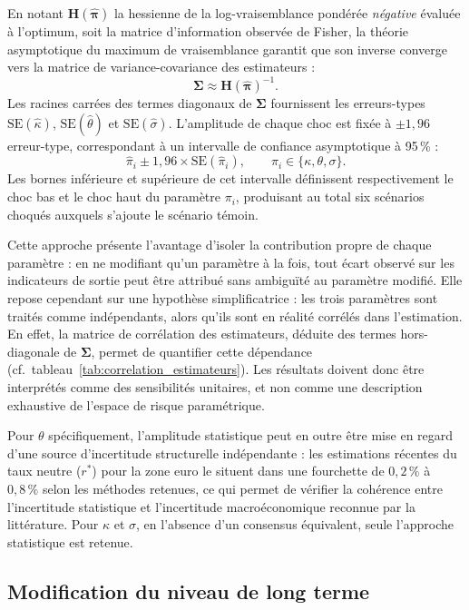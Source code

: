 En notant $\mathbf{H}(\hat{\boldsymbol{\pi}})$ la hessienne de la log-vraisemblance pondérée \textit{négative} évaluée à l'optimum, soit la matrice d'information observée de Fisher, la théorie asymptotique du maximum de vraisemblance garantit que son inverse converge vers la matrice de variance-covariance des estimateurs :
\[
    \boldsymbol{\Sigma} \approx \mathbf{H}(\hat{\boldsymbol{\pi}})^{-1}.
\]
Les racines carrées des termes diagonaux de $\boldsymbol{\Sigma}$ fournissent les erreurs-types $\mathrm{SE}(\hat{\kappa})$, $\mathrm{SE}(\hat{\theta})$ et $\mathrm{SE}(\hat{\sigma})$. L'amplitude de chaque choc est fixée à $\pm 1{,}96$ erreur-type, correspondant à un intervalle de confiance asymptotique à 95\,\% :
\[
    \hat{\pi}_i \pm 1{,}96 \times \mathrm{SE}(\hat{\pi}_i), \qquad \pi_i \in \{\kappa, \theta, \sigma\}.
\]
Les bornes inférieure et supérieure de cet intervalle définissent respectivement le choc bas et le choc haut du paramètre $\pi_i$, produisant au total six scénarios choqués auxquels s'ajoute le scénario témoin.

Cette approche présente l'avantage d'isoler la contribution propre de chaque paramètre : en ne modifiant qu'un paramètre à la fois, tout écart observé sur les indicateurs de sortie peut être attribué sans ambiguïté au paramètre modifié. Elle repose cependant sur une hypothèse simplificatrice : les trois paramètres sont traités comme indépendants, alors qu'ils sont en réalité corrélés dans l'estimation. En effet, la matrice de corrélation des estimateurs, déduite des termes hors-diagonale de $\boldsymbol{\Sigma}$, permet de quantifier cette dépendance (cf.\ tableau~\ref{tab:correlation_estimateurs}). Les résultats doivent donc être interprétés comme des sensibilités unitaires, et non comme une description exhaustive de l'espace de risque paramétrique.

Pour $\theta$ spécifiquement, l'amplitude statistique peut en outre être mise en regard d'une source d'incertitude structurelle indépendante : les estimations récentes du taux neutre ($r^*$) pour la zone euro le situent dans une fourchette de $0{,}2\,\%$ à $0{,}8\,\%$ selon les méthodes retenues, ce qui permet de vérifier la cohérence entre l'incertitude statistique et l'incertitude macroéconomique reconnue par la littérature. Pour $\kappa$ et $\sigma$, en l'absence d'un consensus équivalent, seule l'approche statistique est retenue.


\subsection{Modification du niveau de long terme}

